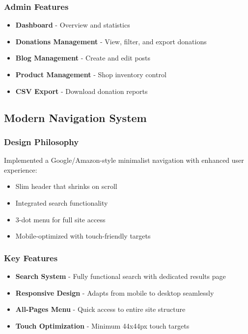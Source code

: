 \documentclass[11pt,a4paper]{article}
\begin{document}
\subsubsection{Admin Features}
\begin{itemize}[leftmargin=*,itemsep=3pt]
    \item \textbf{Dashboard} - Overview and statistics
    \item \textbf{Donations Management} - View, filter, and export donations
    \item \textbf{Blog Management} - Create and edit posts
    \item \textbf{Product Management} - Shop inventory control
    \item \textbf{CSV Export} - Download donation reports
\end{itemize}

\subsection{Modern Navigation System}
\subsubsection{Design Philosophy}
Implemented a Google/Amazon-style minimalist navigation with enhanced user experience:
\begin{itemize}[leftmargin=*,itemsep=3pt]
    \item Slim header that shrinks on scroll
    \item Integrated search functionality
    \item 3-dot menu for full site access
    \item Mobile-optimized with touch-friendly targets
\end{itemize}

\subsubsection{Key Features}
\begin{itemize}[leftmargin=*,itemsep=3pt]
    \item \textbf{Search System} - Fully functional search with dedicated results page
    \item \textbf{Responsive Design} - Adapts from mobile to desktop seamlessly
    \item \textbf{All-Pages Menu} - Quick access to entire site structure
    \item \textbf{Touch Optimization} - Minimum 44x44px touch targets
\end{itemize}
\end{document}
